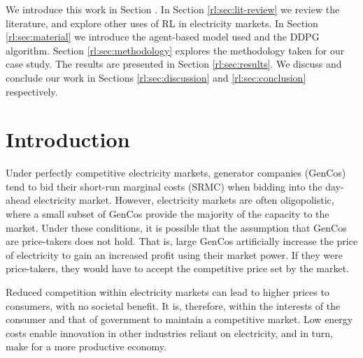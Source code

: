 

We introduce this work in Section \label{rl:sec:introduction}. In Section \ref{rl:sec:lit-review} we review the literature, and explore other uses of RL in electricity markets. In Section \ref{rl:sec:material} we introduce the agent-based model used and the DDPG algorithm. Section \ref{rl:sec:methodology} explores the methodology taken for our case study. The results are presented in Section \ref{rl:sec:results}. We discuss and conclude our work in Sections \ref{rl:sec:discussion} and \ref{rl:sec:conclusion} respectively. 



\section{Introduction}
\label{rl:sec:introduction}


Under perfectly competitive electricity markets, generator companies (GenCos) tend to bid their short-run marginal costs (SRMC) when bidding into the day-ahead electricity market. However, electricity markets are often oligopolistic, where a small subset of GenCos provide the majority of the capacity to the market. Under these conditions, it is possible that the assumption that GenCos are price-takers does not hold. That is, large GenCos artificially increase the price of electricity to gain an increased profit using their market power. If they were price-takers, they would have to accept the competitive price set by the market.

Reduced competition within electricity markets can lead to higher prices to consumers, with no societal benefit. It is, therefore, within the interests of the consumer and that of government to maintain a competitive market. Low energy costs enable innovation in other industries reliant on electricity, and in turn, make for a more productive economy. %

